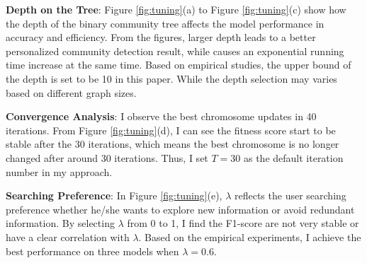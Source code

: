 \textbf{Depth on the Tree}: Figure \ref{fig:tuning}(a) to  Figure \ref{fig:tuning}(c) show how the depth of the binary community tree affects the model performance in accuracy and efficiency. From the figures, larger depth leads to a better personalized community detection result, while causes an exponential running time increase at the same time. Based on empirical studies, the upper bound of the depth is set to be 10 in this paper. While the depth selection may varies based on different graph sizes.

\textbf{Convergence Analysis}: I observe the best chromosome updates in 40 iterations. From Figure \ref{fig:tuning}(d),   I can see the fitness score start to be stable after the 30 iterations, which means the best chromosome is no longer changed after around 30 iterations. Thus, I set $T = 30$ as the default iteration number in my approach.

\textbf{Searching Preference}: In Figure \ref{fig:tuning}(e), $\lambda$ reflects the user searching preference whether he/she wants to explore new information or avoid redundant information. By selecting $\lambda$ from 0 to 1, I find  the F1-score are not very stable or have a clear correlation with $\lambda$. Based on the empirical experiments, I achieve the best performance on three models when $\lambda = 0.6$.
